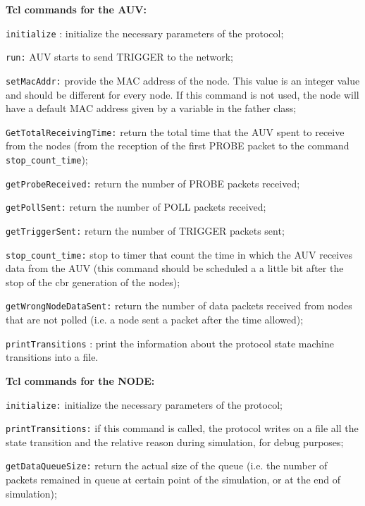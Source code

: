 \begin{description}
   \item {\bf Tcl commands for the AUV:} 
      \begin{description}
	  \item {\tt initialize} : initialize the necessary parameters of the protocol;
	  \item {\tt run:} AUV starts to send TRIGGER to the network;
	  \item {\tt setMacAddr:} provide the MAC address of the node. This value is an integer value and should be different for every node. If this command is not used, the node will have a default MAC address given by a variable in the father class;
	  \item {\tt GetTotalReceivingTime:} return the total time that the AUV spent to receive from the nodes (from the reception of the first PROBE packet to the command {\tt stop\_count\_time});
	  \item {\tt getProbeReceived:} return the number of PROBE packets received;
	  \item {\tt getPollSent:} return the number of POLL packets received;
	  \item {\tt getTriggerSent:} return the number of TRIGGER packets sent;
	  \item {\tt stop\_count\_time:} stop to timer that count the time in which the AUV receives data from the AUV (this command should be scheduled a a little bit after the stop of the cbr generation of the nodes);
	  \item {\tt getWrongNodeDataSent:} return the number of data packets received from nodes that are not polled (i.e. a node sent a packet after the time allowed);
\item {\tt printTransitions} : print the information about the protocol state machine transitions into a file.
       \end{description}
   \item {\bf Tcl commands for the NODE:}
      \begin{description}
	  \item {\tt initialize:} initialize the necessary parameters of the protocol;
	  \item {\tt printTransitions:} if this command is called, the protocol writes on a file all the state transition and the relative reason during simulation, for debug purposes; 
	  \item {\tt getDataQueueSize:} return the actual size of the queue (i.e. the number of packets remained in queue at certain point of the simulation, or at the end of simulation);

\end{description}
\end{description}
